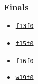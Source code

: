 \begin{minipage}[t]{\width\textwidth}
    \subsubsection*{Finals}
    \begin{itemize}
        \item \st{\texttt{f13f0}}
        \item \st{\texttt{f15f0}}
        \item \texttt{f16f0}
        \item \st{\texttt{w19f0}}
    \end{itemize}
\end{minipage}